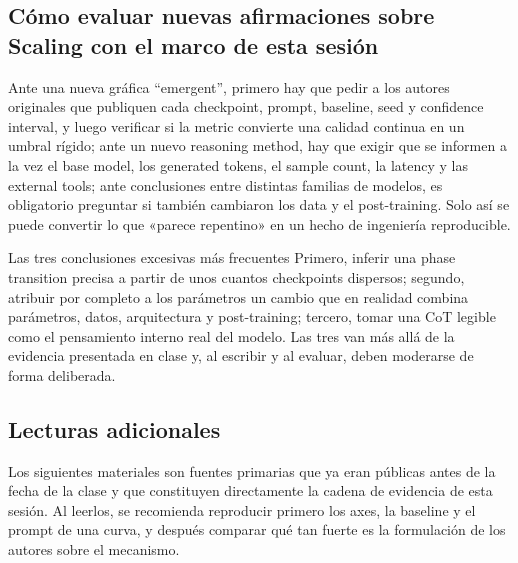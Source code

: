 \documentclass[a4paper]{article}
\begin{document}
\subsection{Cómo evaluar nuevas afirmaciones sobre Scaling con el marco de esta sesión}

Ante una nueva gráfica ``emergent'', primero hay que pedir a los autores originales que publiquen cada checkpoint, prompt, baseline, seed y confidence interval, y luego verificar si la metric convierte una calidad continua en un umbral rígido; ante un nuevo reasoning method, hay que exigir que se informen a la vez el base model, los generated tokens, el sample count, la latency y las external tools; ante conclusiones entre distintas familias de modelos, es obligatorio preguntar si también cambiaron los data y el post-training. Solo así se puede convertir lo que «parece repentino» en un hecho de ingeniería reproducible.

\begin{warningbox}{Las tres conclusiones excesivas más frecuentes}
Primero, inferir una phase transition precisa a partir de unos cuantos checkpoints dispersos; segundo, atribuir por completo a los parámetros un cambio que en realidad combina parámetros, datos, arquitectura y post-training; tercero, tomar una CoT legible como el pensamiento interno real del modelo. Las tres van más allá de la evidencia presentada en clase y, al escribir y al evaluar, deben moderarse de forma deliberada.
\end{warningbox}

\subsection{Lecturas adicionales}

Los siguientes materiales son fuentes primarias que ya eran públicas antes de la fecha de la clase y que constituyen directamente la cadena de evidencia de esta sesión. Al leerlos, se recomienda reproducir primero los axes, la baseline y el prompt de una curva, y después comparar qué tan fuerte es la formulación de los autores sobre el mecanismo.
\end{document}
